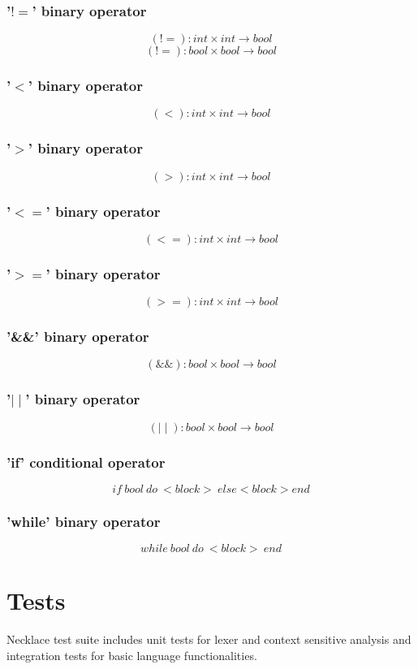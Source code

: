 \documentclass{article}
\begin{document}
\subsubsection{'$!=$' binary operator}
$$
(!=): int \times int \longrightarrow bool
$$
$$
(!=): bool \times bool \longrightarrow bool
$$

\subsubsection{'$<$' binary operator}
$$
(<): int \times int \longrightarrow bool
$$

\subsubsection{'$>$' binary operator}
$$
(>): int \times int \longrightarrow bool
$$
\subsubsection{'$<=$' binary operator}
$$
(<=): int \times int \longrightarrow bool
$$
\subsubsection{'$>=$' binary operator}
$$
(>=): int \times int \longrightarrow bool
$$
\subsubsection{'\&\&' binary operator}
$$
(\&\&): bool \times bool \longrightarrow bool
$$
\subsubsection{'$\mid\mid$' binary operator}
$$
(\mid\mid): bool \times bool \longrightarrow bool
$$
\subsubsection{'if' conditional operator}
$$
if \ bool \ do \ <block> \ else <block> end
$$
\subsubsection{'while' binary operator}
$$
while \ bool \ do \ <block> \ end
$$
\section{Tests}
Necklace test suite includes unit tests for lexer and context sensitive analysis and integration tests for basic language functionalities.
\end{document}

